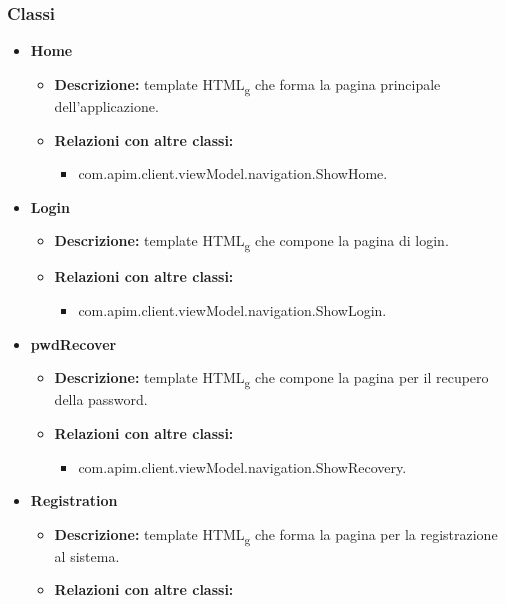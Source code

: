 {{		\subsubsection{Classi}{
			\begin{itemize}
				\item \textbf{Home}
					\begin{itemize}
						\item \textbf{Descrizione:}  template HTML\textsubscript{g} che forma la pagina principale dell'applicazione.
						\item \textbf{Relazioni con altre classi:}
						\begin{itemize}
							\item com.apim.client.viewModel.navigation.ShowHome.
						\end{itemize}
					\end{itemize}
				\item \textbf{Login}
					\begin{itemize}
						\item \textbf{Descrizione:}  template HTML\textsubscript{g} che compone la pagina di login.
						\item \textbf{Relazioni con altre classi:}
						\begin{itemize}
							\item com.apim.client.viewModel.navigation.ShowLogin.
						\end{itemize}
					\end{itemize}
				\item \textbf{pwdRecover}
					\begin{itemize}
						\item \textbf{Descrizione:}  template HTML\textsubscript{g} che compone la pagina per il recupero della password.
						\item \textbf{Relazioni con altre classi:}
						\begin{itemize}
							\item com.apim.client.viewModel.navigation.ShowRecovery.
						\end{itemize}
					\end{itemize}
				\item \textbf{Registration}
					\begin{itemize}
						\item \textbf{Descrizione:}  template HTML\textsubscript{g} che forma la pagina per la registrazione al sistema.
						\item \textbf{Relazioni con altre classi:}
						\begin{itemize}

\end{itemize}
\end{itemize}
\end{itemize}}}}
